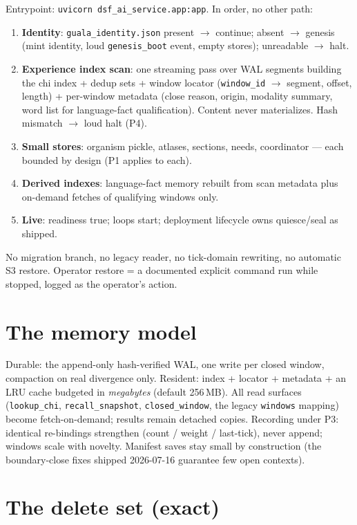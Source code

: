 \documentclass[11pt]{article}
\begin{document}
Entrypoint: \texttt{uvicorn dsf\_ai\_service.app:app}. In order, no other
path:
\begin{enumerate}[nosep]
  \item \textbf{Identity}: \texttt{guala\_identity.json} present $\to$
        continue; absent $\to$ genesis (mint identity, loud
        \texttt{genesis\_boot} event, empty stores); unreadable $\to$ halt.
  \item \textbf{Experience index scan}: one streaming pass over WAL
        segments building the chi index + dedup sets + window locator
        (\texttt{window\_id} $\to$ segment, offset, length) + per-window
        metadata (close reason, origin, modality summary, word list for
        language-fact qualification). Content never materializes. Hash
        mismatch $\to$ loud halt (P4).
  \item \textbf{Small stores}: organism pickle, atlases, sections, needs,
        coordinator — each bounded by design (P1 applies to each).
  \item \textbf{Derived indexes}: language-fact memory rebuilt from scan
        metadata plus on-demand fetches of qualifying windows only.
  \item \textbf{Live}: readiness true; loops start; deployment lifecycle
        owns quiesce/seal as shipped.
\end{enumerate}
No migration branch, no legacy reader, no tick-domain rewriting, no
automatic S3 restore. Operator restore = a documented explicit command run
while stopped, logged as the operator's action.

\section{The memory model}\label{sec:memory}

Durable: the append-only hash-verified WAL, one write per closed window,
compaction on real divergence only. Resident: index + locator + metadata +
an LRU cache budgeted in \emph{megabytes} (default 256\,MB). All read
surfaces (\texttt{lookup\_chi}, \texttt{recall\_snapshot},
\texttt{closed\_window}, the legacy \texttt{windows} mapping) become
fetch-on-demand; results remain detached copies. Recording under P3:
identical re-bindings strengthen (count / weight / last-tick), never
append; windows scale with novelty. Manifest saves stay small by
construction (the boundary-close fixes shipped 2026-07-16 guarantee few
open contexts).

\section{The delete set (exact)}\label{sec:delete}
\end{document}
